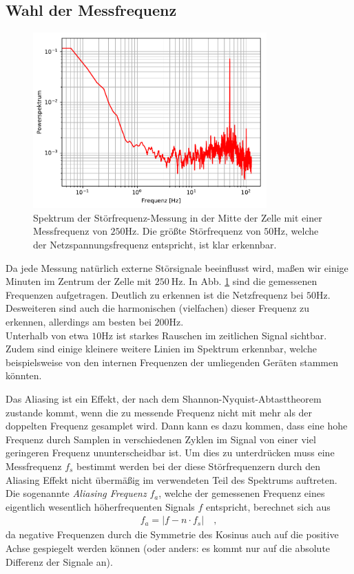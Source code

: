 \documentclass[12pt,a4paper,titlepage,headinclude]{scrartcl}
\numberwithin{equation}{subsection}
\begin{document}
\subsection{Wahl der Messfrequenz}

\begin{figure}[!ht]
\centering
\includegraphics[width=0.8\textwidth]{stoer}
\caption{Spektrum der Störfrequenz-Messung in der Mitte der Zelle mit einer Messfrequenz von $250\si{\hertz}$. Die größte Störfrequenz von $50\si{\hertz}$, welche der Netzspannungsfrequenz entspricht, ist klar erkennbar.}
\label{fig:stoer}
\end{figure}

Da jede Messung natürlich externe Störsignale beeinflusst wird, maßen wir einige Minuten im Zentrum der Zelle mit $\SI{250}\hertz$.
In Abb. \ref{fig:stoer} sind die gemessenen Frequenzen aufgetragen.
Deutlich zu erkennen ist die Netzfrequenz bei $50\si{\hertz}$.
Desweiteren sind auch die harmonischen (vielfachen) dieser Frequenz zu erkennen, allerdings am besten bei $200\si{\hertz}$.\\
Unterhalb von etwa $10\si{\hertz}$ ist starkes Rauschen im zeitlichen Signal sichtbar.
Zudem sind einige kleinere weitere Linien im Spektrum erkennbar, welche beispielsweise von den internen Frequenzen der umliegenden Geräten stammen könnten.

Das Aliasing ist ein Effekt, der nach dem Shannon-Nyquist-Abtasttheorem zustande kommt, wenn die zu messende Frequenz nicht mit mehr als der doppelten Frequenz gesamplet wird.
Dann kann es dazu kommen, dass eine hohe Frequenz durch Samplen in verschiedenen Zyklen im Signal von einer viel geringeren Frequenz ununterscheidbar ist.
Um dies zu unterdrücken muss eine Messfrequenz $f_s$ bestimmt werden bei der diese Störfrequenzern durch den Aliasing Effekt nicht übermäßig im verwendeten Teil des Spektrums auftreten.
Die sogenannte \textit{Aliasing Frequenz} $f_a$, welche der gemessenen Frequenz eines eigentlich wesentlich höherfrequenten Signals $f$ entspricht, berechnet sich aus
\begin{align}
  f_a=|f-n\cdot f_s|\quad,
  \label{eq:stoerfreq}
\end{align}
da negative Frequenzen durch die Symmetrie des Kosinus auch auf die positive Achse gespiegelt werden können (oder anders: es kommt nur auf die absolute Differenz der Signale an).
\end{document}
